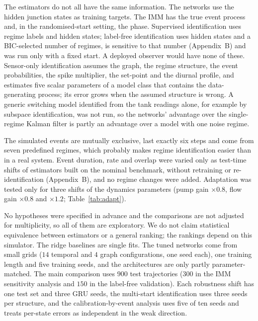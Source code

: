 \documentclass[conference]{IEEEtran}
\begin{document}
The estimators do not all have the same information. The networks use the hidden junction states as training targets. The IMM has the true event process and, in the randomised-start setting, the phase. Supervised identification uses regime labels and hidden states; label-free identification uses hidden states and a BIC-selected number of regimes, is sensitive to that number (Appendix~B) and was run only with a fixed start. A deployed observer would have none of these. Sensor-only identification assumes the graph, the regime structure, the event probabilities, the spike multiplier, the set-point and the diurnal profile, and estimates five scalar parameters of a model class that contains the data-generating process; its error grows when the assumed structure is wrong. A generic switching model identified from the tank readings alone, for example by subspace identification, was not run, so the networks' advantage over the single-regime Kalman filter is partly an advantage over a model with one noise regime.

The simulated events are mutually exclusive, last exactly six steps and come from seven predefined regimes, which probably makes regime identification easier than in a real system. Event duration, rate and overlap were varied only as test-time shifts of estimators built on the nominal benchmark, without retraining or re-identification (Appendix~B), and no regime changes were added. Adaptation was tested only for three shifts of the dynamics parameters (pump gain $\times0.8$, flow gain $\times0.8$ and $\times1.2$; Table~\ref{tab:adapt}).

No hypotheses were specified in advance and the comparisons are not adjusted for multiplicity, so all of them are exploratory. We do not claim statistical equivalence between estimators or a general ranking; the rankings depend on this simulator. The ridge baselines are single fits. The tuned networks come from small grids ($14$ temporal and $4$ graph configurations, one seed each), one training length and five training seeds, and the architectures are only partly parameter-matched. The main comparison uses $900$ test trajectories ($300$ in the IMM sensitivity analysis and $150$ in the label-free validation). Each robustness shift has one test set and three GRU seeds, the multi-start identification uses three seeds per structure, and the calibration-by-event analysis uses five of ten seeds and treats per-state errors as independent in the weak direction.
\end{document}
